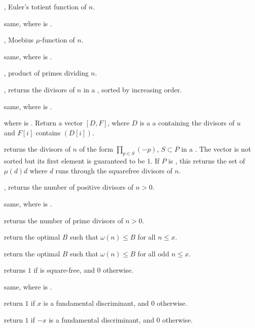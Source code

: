 , Euler's totient function of $n$.

 same, where  is .

, Moebius $\mu$-function of $n$.

 same, where  is .

, product of primes dividing $n$.

, returns the divisors of $n$ in a
, sorted by increasing order.

 same, where  is .

 where  is .
Return a vector $[D,F]$, where $D$ is a a  containing the
divisors of $u$ and $F[i]$ contains $(D[i])$.

 returns the divisors of $n$ of the form
$\prod_{p\in S} (-p)$, $S\subset P$ in a . The vector is not
sorted but its first element is guaranteed to be $1$. If $P$ is
, this returns the set of $\mu(d) d$ where $d$ runs
through the squarefree divisors of $n$.

, returns the number of positive divisors of $n>0$.

 same, where  is .

 returns the number of prime divisors of $n > 0$.

 return the optimal $B$ such that $\omega(n)
\leq B $ for all $n \leq x$.

 return the optimal $B$ such that $\omega(n)
\leq B $ for all odd $n \leq x$.

 returns $1$ if 
is square-free, and $0$ otherwise.

 same, where  is
.

 return $1$ if $x$ is a fundamental
discriminant, and $0$ otherwise.

 return $1$ if $-x$ is a fundamental
discriminant, and $0$ otherwise.

